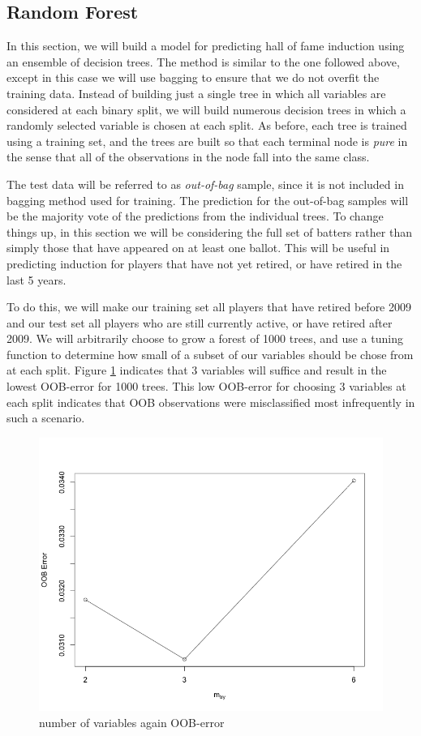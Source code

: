 \documentclass[preprint,12pt]{elsarticle}
\begin{document}
\subsection{Random Forest}
In this section, we will build a model for predicting hall of fame induction using an ensemble of decision trees. The method is similar to the one followed above, except in this case we will use bagging to ensure that we do not overfit the training data. Instead of building just a single tree in which all variables are considered at each binary split, we will build numerous decision trees in which a randomly selected variable is chosen at each split. As before, each tree is trained using a training set, and the trees are built so that each terminal node is \textit{pure} in the sense that all of the observations in the node fall into the same class.

The test data will be referred to as \textit{out-of-bag} sample, since it is not included in bagging method used for training. The prediction for the out-of-bag samples will be the majority vote of the predictions from the individual trees. To change things up, in this section we will be considering the full set of batters rather than simply those that have appeared on at least one ballot. This will be useful in predicting induction for players that have not yet retired, or have retired in the last 5 years.

To do this, we will make our training set all players that have retired before 2009 and our test set all players who are still currently active, or have retired after 2009. We will arbitrarily choose to grow a forest of 1000 trees, and use a tuning function to determine how small of a subset of our variables should be chose from at each split. Figure \ref{mtry} indicates that 3 variables will suffice and result in the lowest OOB-error for 1000 trees. This low OOB-error for choosing 3 variables at each split indicates that OOB observations were misclassified most infrequently in such a scenario.

\begin{figure}[h]
       \centering 
       \includegraphics[width=0.85\linewidth]{mtry}
       \caption{number of variables again OOB-error}
       \label{mtry}
 \end{figure}
\end{document}
